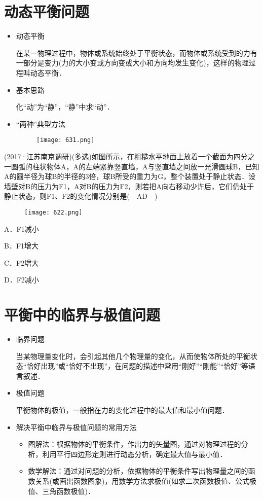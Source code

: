 \documentclass[cn,11pt]{elegantbook}
\begin{document}
\newpage\section{动态平衡问题}
\begin{itemize}
   \item 动态平衡
   
   在某一物理过程中，物体或系统始终处于平衡状态，而物体或系统受到的力有一部分是变力(力的大小变或方向变或大小和方向均发生变化)，这样的物理过程叫动态平衡．
   \item 基本思路
   
   化“动”为“静”，“静”中求“动”．
   \item “两种”典型方法
   \begin{figure}[htbp]
      \centering
      \texttt{[image: 631.png]}
   \end{figure}
\end{itemize}
\begin{example}
   (2017·江苏南京调研)(多选)如图所示，在粗糙水平地面上放着一个截面为四分之一圆弧的柱状物体A，A的左端紧靠竖直墙，A与竖直墙之间放一光滑圆球B，已知A的圆半径为球B的半径的3倍，球B所受的重力为G，整个装置处于静止状态．设墙壁对B的压力为F1，A对B的压力为F2，则若把A向右移动少许后，它们仍处于静止状态，则F1、F2的变化情况分别是(　AD　)
   \begin{figure}[htbp]
      \centering
      \texttt{[image: 622.png]}
   \end{figure}
   
   A．F1减小	
   
   B．F1增大
   
   C．F2增大	
   
   D．F2减小   
\end{example}




\newpage\section{平衡中的临界与极值问题}
\begin{itemize}
   \item 临界问题
   
   当某物理量变化时，会引起其他几个物理量的变化，从而使物体所处的平衡状态“恰好出现”或“恰好不出现”，在问题的描述中常用“刚好”“刚能”“恰好”等语言叙述．
   \item 极值问题
   
   平衡物体的极值，一般指在力的变化过程中的最大值和最小值问题．
   \item 解决平衡中临界与极值问题的常用方法
   \begin{itemize}
      \item 图解法：根据物体的平衡条件，作出力的矢量图，通过对物理过程的分析，利用平行四边形定则进行动态分析，确定最大值与最小值．
      \item 数学解法：通过对问题的分析，依据物体的平衡条件写出物理量之间的函数关系(或画出函数图象)，用数学方法求极值(如求二次函数极值、公式极值、三角函数极值)．
   \end{itemize}
\end{itemize}
\end{document}
